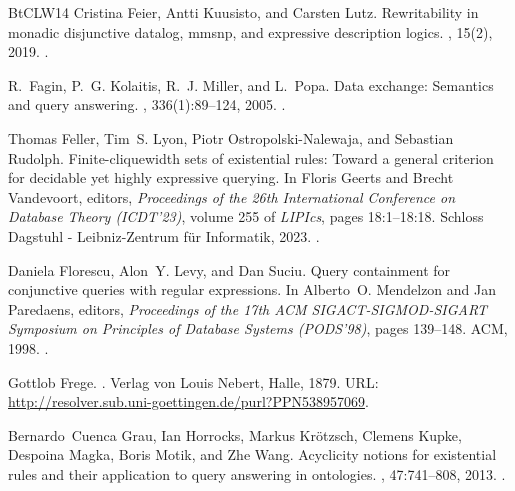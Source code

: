 \documentclass[10pt,a4paper]{amsart}
\theoremstyle{definition}
\numberwithin{equation}{section}
\theoremstyle{plain}
\theoremstyle{definition}
\theoremstyle{myexample}
\theoremstyle{plain}
\theoremstyle{definition}
\begin{document}
\begin{thebibliography}{BtCLW14}
Cristina Feier, Antti Kuusisto, and Carsten Lutz.
\newblock Rewritability in monadic disjunctive datalog, mmsnp, and expressive
  description logics.
, 15(2), 2019.
\newblock \href {https://doi.org/10.23638/LMCS-15(2:15)2019}
  {}.

R.~Fagin, P.~G. Kolaitis, R.~J. Miller, and L.~Popa.
\newblock Data exchange: Semantics and query answering.
, 336(1):89–124, 2005.
\newblock \href {https://doi.org/10.1016/J.TCS.2004.10.033}
  {}.

Thomas Feller, Tim~S. Lyon, Piotr Ostropolski{-}Nalewaja, and Sebastian
  Rudolph.
\newblock Finite-cliquewidth sets of existential rules: Toward a general
  criterion for decidable yet highly expressive querying.
\newblock In Floris Geerts and Brecht Vandevoort, editors, {\em Proceedings of
  the 26th International Conference on Database Theory {(ICDT'23)}}, volume 255
  of {\em LIPIcs}, pages 18:1--18:18. Schloss Dagstuhl - Leibniz-Zentrum
  f{\"{u}}r Informatik, 2023.
\newblock \href {https://doi.org/10.4230/LIPIcs.ICDT.2023.18}
  {}.

Daniela Florescu, Alon~Y. Levy, and Dan Suciu.
\newblock Query containment for conjunctive queries with regular expressions.
\newblock In Alberto~O. Mendelzon and Jan Paredaens, editors, {\em Proceedings
  of the 17th {ACM} {SIGACT-SIGMOD-SIGART} Symposium on Principles of Database
  Systems (PODS'98)}, pages 139--148. {ACM}, 1998.
\newblock \href {https://doi.org/10.1145/275487.275503}
  {}.

Gottlob Frege.
.
\newblock Verlag von Louis Nebert, Halle, 1879.
\newblock URL: \url{http://resolver.sub.uni-goettingen.de/purl?PPN538957069}.

Bernardo~Cuenca Grau, Ian Horrocks, Markus Kr{\"{o}}tzsch, Clemens Kupke,
  Despoina Magka, Boris Motik, and Zhe Wang.
\newblock Acyclicity notions for existential rules and their application to
  query answering in ontologies.
, 47:741--808, 2013.
\newblock \href {https://doi.org/10.1613/jair.3949}
  {}.


\end{thebibliography}
\end{document}
